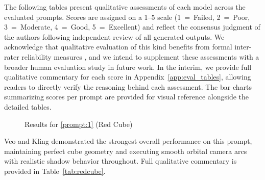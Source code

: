 \documentclass[sigconf]{acmart}
\begin{document}
The following tables present qualitative assessments of each model
across the evaluated prompts. Scores are assigned on a 1--5 scale
(1~=~Failed, 2~=~Poor, 3~=~Moderate, 4~=~Good, 5~=~Excellent) and
reflect the consensus judgment of the authors following independent
review of all generated outputs. We acknowledge that qualitative
evaluation of this kind benefits from formal inter-rater reliability
measures \cite{krippendorff2011content}, and we intend to supplement
these assessments with a broader human evaluation study in future
work. In the interim, we provide full qualitative commentary for
each score in Appendix~\ref{app:eval_tables}, allowing readers to
directly verify the reasoning behind each assessment. The bar charts
summarizing scores per prompt are provided for visual reference
alongside the detailed tables.
\begin{figure}[H]
    \centering
    \caption{Results for \ref{prompt:1} (Red Cube)}
    \label{fig:eval_prompt_1}
\end{figure}

\noindent Veo and Kling demonstrated the strongest overall performance
on this prompt, maintaining perfect cube geometry and executing smooth
orbital camera arcs with realistic shadow behavior throughout. Full qualitative commentary is provided in
Table~\ref{tab:redcube}.
\end{document}
